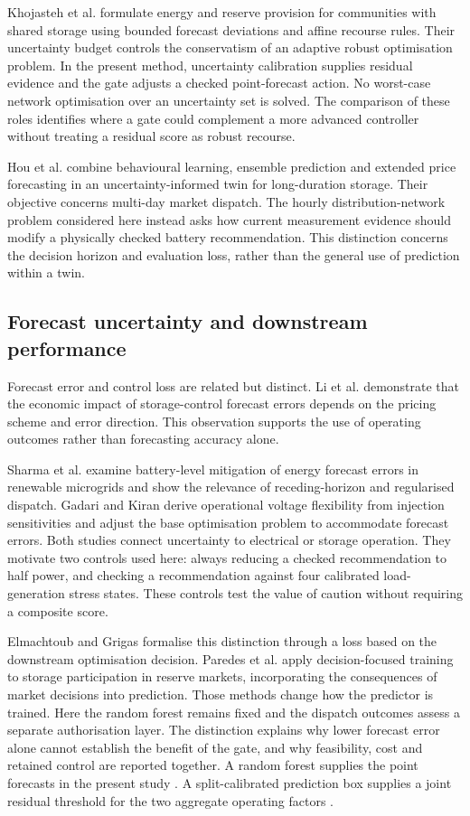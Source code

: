 \documentclass[preprint,12pt]{elsarticle}
\begin{document}
Khojasteh et al. \cite{khojasteh} formulate energy and reserve provision for communities with shared storage using bounded forecast deviations and affine recourse rules. Their uncertainty budget controls the conservatism of an adaptive robust optimisation problem. In the present method, uncertainty calibration supplies residual evidence and the gate adjusts a checked point-forecast action. No worst-case network optimisation over an uncertainty set is solved. The comparison of these roles identifies where a gate could complement a more advanced controller without treating a residual score as robust recourse.


Hou et al. \cite{hou} combine behavioural learning, ensemble prediction and extended price forecasting in an uncertainty-informed twin for long-duration storage. Their objective concerns multi-day market dispatch. The hourly distribution-network problem considered here instead asks how current measurement evidence should modify a physically checked battery recommendation. This distinction concerns the decision horizon and evaluation loss, rather than the general use of prediction within a twin.

\subsection{Forecast uncertainty and downstream performance}
Forecast error and control loss are related but distinct. Li et al. \cite{li} demonstrate that the economic impact of storage-control forecast errors depends on the pricing scheme and error direction. This observation supports the use of operating outcomes rather than forecasting accuracy alone.

Sharma et al. \cite{sharma} examine battery-level mitigation of energy forecast errors in renewable microgrids and show the relevance of receding-horizon and regularised dispatch. Gadari and Kiran \cite{gadari} derive operational voltage flexibility from injection sensitivities and adjust the base optimisation problem to accommodate forecast errors. Both studies connect uncertainty to electrical or storage operation. They motivate two controls used here: always reducing a checked recommendation to half power, and checking a recommendation against four calibrated load-generation stress states. These controls test the value of caution without requiring a composite score.

Elmachtoub and Grigas \cite{elmachtoub} formalise this distinction through a loss based on the downstream optimisation decision. Paredes et al. \cite{paredes} apply decision-focused training to storage participation in reserve markets, incorporating the consequences of market decisions into prediction. Those methods change how the predictor is trained. Here the random forest remains fixed and the dispatch outcomes assess a separate authorisation layer. The distinction explains why lower forecast error alone cannot establish the benefit of the gate, and why feasibility, cost and retained control are reported together.
 A random forest supplies the point forecasts in the present study \cite{breiman}. A split-calibrated prediction box supplies a joint residual threshold for the two aggregate operating factors \cite{angelopoulos}.
\end{document}
